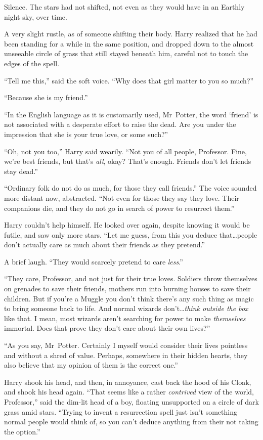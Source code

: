 Silence. The stars had not shifted, not even as they would have in an Earthly night sky, over time.

A very slight rustle, as of someone shifting their body. Harry realized that he had been standing for a while in the same position, and dropped down to the almost unseeable circle of grass that still stayed beneath him, careful not to touch the edges of the spell.

“Tell me this,” said the soft voice. “Why does that girl matter to you so much?”

“Because she is my friend.”

“In the English language as it is customarily used, Mr~Potter, the word ‘friend’ is not associated with a desperate effort to raise the dead. Are you under the impression that she is your true love, or some such?”

“Oh, not you too,” Harry said wearily. “Not you of all people, Professor. Fine, we’re best friends, but that’s \emph{all}, okay? That’s enough. Friends don’t let friends stay dead.”

“Ordinary folk do not do as much, for those they call friends.” The voice sounded more distant now, abstracted. “Not even for those they say they love. Their companions die, and they do not go in search of power to resurrect them.”

Harry couldn’t help himself. He looked over again, despite knowing it would be futile, and saw only more stars. “Let me guess, from this you deduce that…people don’t actually care as much about their friends as they pretend.”

A brief laugh. “They would scarcely pretend to care \emph{less}.”

“They care, Professor, and not just for their true loves. Soldiers throw themselves on grenades to save their friends, mothers run into burning houses to save their children. But if you’re a Muggle you don’t think there’s any such thing as magic to bring someone back to life. And normal wizards don’t…\emph{think outside the box} like that. I mean, most wizards aren’t searching for power to make \emph{themselves} immortal. Does that prove they don’t care about their own lives?”

“As you say, Mr~Potter. Certainly I myself would consider their lives pointless and without a shred of value. Perhaps, somewhere in their hidden hearts, they also believe that my opinion of them is the correct one.”

Harry shook his head, and then, in annoyance, cast back the hood of his Cloak, and shook his head again. “That seems like a rather \emph{contrived} view of the world, Professor,” said the dim-lit head of a boy, floating unsupported on a circle of dark grass amid stars. “Trying to invent a resurrection spell just isn’t something normal people would think of, so you can’t deduce anything from their not taking the option.”

